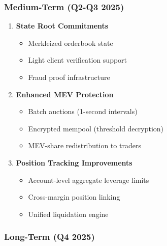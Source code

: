 \documentclass[
]{article}
\providecommand{\tightlist}{%
  \setlength{\itemsep}{0pt}\setlength{\parskip}{0pt}}
\begin{document}
\subsubsection{Medium-Term (Q2-Q3 2025)}\label{medium-term-q2-q3-2025}

\begin{enumerate}
\def\labelenumi{\arabic{enumi}.}
\setcounter{enumi}{4}
\item
  \textbf{State Root Commitments}

  \begin{itemize}
  \tightlist
  \item
    Merkleized orderbook state
  \item
    Light client verification support
  \item
    Fraud proof infrastructure
  \end{itemize}
\item
  \textbf{Enhanced MEV Protection}

  \begin{itemize}
  \tightlist
  \item
    Batch auctions (1-second intervals)
  \item
    Encrypted mempool (threshold decryption)
  \item
    MEV-share redistribution to traders
  \end{itemize}
\item
  \textbf{Position Tracking Improvements}

  \begin{itemize}
  \tightlist
  \item
    Account-level aggregate leverage limits
  \item
    Cross-margin position linking
  \item
    Unified liquidation engine
  \end{itemize}
\end{enumerate}

\subsubsection{Long-Term (Q4 2025)}\label{long-term-q4-2025}
\end{document}
